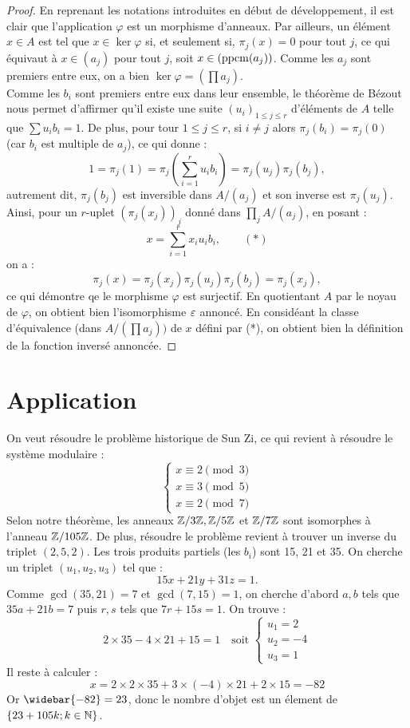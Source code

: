 \begin{proof}
En reprenant les notations introduites en début de développement, il est clair que l'application $\varphi$ est un morphisme d'anneaux.
Par ailleurs, un élément $x \in A$ est tel que $x \in \ker{\varphi}$ si, et seulement si, $\pi_j(x)=0$ pour tout $j$, ce qui équivaut à 
$x \in (a_j)$ pour tout $j$, soit $x \in (\operatorname{ppcm}(a_j))$. 
Comme les $a_j$ sont premiers entre eux, on a bien $\ker{\varphi} = \left ( \prod a_j \right )$. \\
Comme les $b_i$ sont premiers entre eux dans leur ensemble, le théorème de Bézout nous permet d'affirmer qu'il existe une suite  
$(u_i)_{1 \leq j \leq r}$ d'éléments de $A$ telle que $\sum u_i b_i = 1$. De plus, pour tour $1 \leq j \leq r$, si $i \neq j$ alors
$\pi_j(b_i) = \pi_j(0)$ (car $b_i$ est multiple de $a_j$), ce qui donne :
\[ 1 = \pi_j(1) = \pi_j \left( \sum_{i=1}^r u_i b_i \right) = \pi_j(u_j) \pi_j(b_j) , \]
autrement dit, $\pi_j(b_j)$ est inversible dans $A / (a_j)$ et son inverse est $\pi_j(u_j)$. \\
Ainsi, pour un $r$-uplet $(\pi_j(x_j))_j$ donné dans $\prod_j A / (a_j)$, en posant :
\[ x = \sum_{i=1}^r x_i u_i b_i , \qquad (*) \]
on a :
\[ \pi_j (x) = \pi_j(x_j) \pi_j(u_j) \pi_j(b_j) = \pi_j(x_j) , \]
ce qui démontre qe le morphisme $\varphi$ est surjectif. En quotientant $A$ par le noyau de $\varphi$, on obtient bien l'isomorphisme
$\varepsilon$ annoncé. En considéant la classe d'équivalence (dans $A / \left ( \prod a_j \right ) )$ de $x$ défini par (*), 
on obtient bien la définition de la fonction inversé annoncée.
\end{proof}

\section{Application}

On veut résoudre le problème historique de Sun Zi, ce qui revient à résoudre le système modulaire :
\[ \left \{ \begin{array}{c} 
x \equiv 2 \pmod 3 \\ 
x \equiv 3 \pmod 5 \\ 
x \equiv 2 \pmod 7
\end{array} \right.  \]
Selon notre théorème, les anneaux $\mathbb{Z}/3\mathbb{Z}, \mathbb{Z}/5\mathbb{Z}$ et $\mathbb{Z}/7\mathbb{Z}$ sont isomorphes à l'anneau $\mathbb{Z}/105\mathbb{Z}$. 
De plus, résoudre le problème revient à trouver un inverse du triplet $(2,5,2)$.
Les trois \og produits partiels \fg{} (les $b_i$) sont 15, 21 et 35. On cherche un triplet $(u_1,u_2,u_3)$ tel que :
\[ 15x + 21y + 31z = 1 . \]
Comme $\gcd(35,21)=7$ et $\gcd(7,15)=1$, on cherche d'abord $a,b$ tels que $35a + 21b = 7$ puis $r,s$ tels que $7r + 15s = 1$.
On trouve :
\[ 2 \times 35 - 4 \times 21 + 15 = 1 \quad \text{soit } \left \{ \begin{array}{c} u_1 = 2 \\ u_2 = -4 \\ u_3 = 1 \end{array} \right.  \]
Il reste à calculer :
\[ x = 2 \times 2 \times 35 + 3 \times (-4) \times 21 + 2 \times 15 = -82 \]
Or $\widebar{-82} = 23$, donc le nombre d'objet est un élement de $\{ 23 + 105 k ; k \in \mathbb{N}  \}$.

